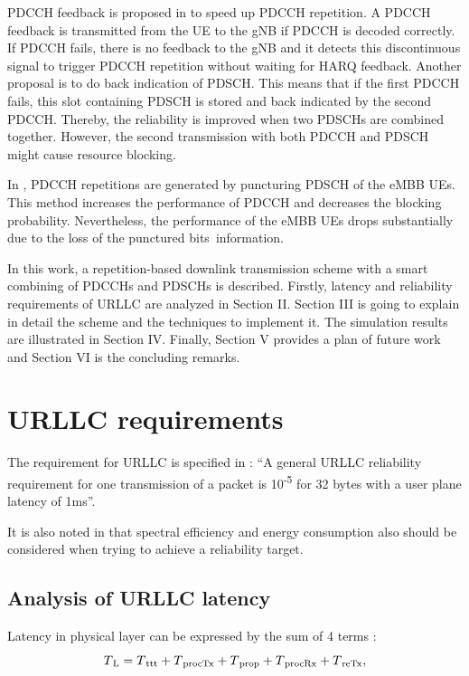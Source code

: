 \documentclass[conference,10pt]{IEEEtran}
\begin{document}
PDCCH feedback is proposed in \cite{b4} to speed up PDCCH repetition. A PDCCH feedback is transmitted from the UE to the gNB if PDCCH is decoded correctly. If PDCCH fails, there is no feedback to the gNB and it detects this discontinuous signal to trigger PDCCH repetition without waiting for HARQ feedback. Another proposal is to do back indication of PDSCH. This means that if the first PDCCH fails, this slot containing PDSCH is stored and back indicated by the second PDCCH. Thereby, the reliability is improved when two PDSCHs are combined together. However, the second transmission with both PDCCH and PDSCH might cause resource blocking.

In \cite{b5}, PDCCH repetitions are generated by puncturing PDSCH of the eMBB UEs. This method increases the performance of PDCCH and decreases the blocking probability. Nevertheless, the performance of the eMBB UEs drops substantially due to the loss of the punctured bits\textquotesingle \, information.

In this work, a repetition-based downlink transmission scheme with a smart combining of PDCCHs and PDSCHs is described. Firstly, latency and reliability requirements of URLLC are analyzed in Section II. Section III is going to explain in detail the scheme and the techniques to implement it. The simulation results are illustrated in Section IV. Finally, Section V provides a plan of future work and Section VI is the concluding remarks.

\section{URLLC requirements}
The requirement for URLLC is specified in \cite{b6}: ``A general URLLC reliability requirement for one transmission of a packet is 10\textsuperscript{-5} for 32 bytes with a user plane latency of 1ms''.

It is also noted in \cite{b6} that spectral efficiency and energy consumption also should be considered when trying to achieve a reliability target. 
\subsection{Analysis of URLLC latency}
Latency in physical layer can be expressed by the sum of 4 terms \cite{ad1}:
\begin{equation}
T\textsubscript{L}= T\textsubscript{ttt} + T\textsubscript{procTx} + T\textsubscript{prop} + T\textsubscript{procRx} + T\textsubscript{reTx},\label{eq1}
\end{equation}
\end{document}
